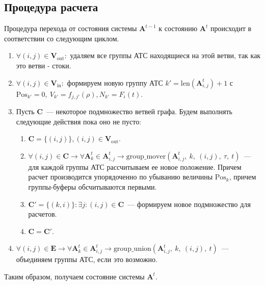 \subsection{Процедура расчета}
Процедура перехода от состояния системы $\mathbf{A}^{t-1}$ к состоянию $\mathbf{A}^t$ происходит в соответствии со следующим циклом.
\begin{enumerate}
  \item $\forall (i, j) \in \mathbf{V}_\text{out}:$ удаляем все группы АТС находящиеся на этой ветви, так как это ветви - стоки.
  \item $\forall (i, j) \in \mathbf{V}_\text{in}:$ формируем новую группу АТС $k' = \text{len}(\mathbf{A}^t_{i,j}) + 1$ с $\mathrm{Pos}_{k'}  = 0,\ V_{k'}  = f_{j,j'}(\rho), N_{k'} = F_i(t)$.
  \item Пусть $\mathbf{C}$~--- некоторое подмножество ветвей графа. Будем выполнять следующие действия пока оно не пусто:
  \begin{enumerate}
      \item $\mathbf{C} = \{(i, j)\}, (i, j) \in \mathbf{V}_\text{out}$.
      \item $\forall (i, j) \in \mathbf{C} \rightarrow \forall \mathbf{A}^t_k \in \mathbf{A}^t_{i,j} \rightarrow \text{group\_mover}(\mathbf{A}^t_{i,j},\ k,\ (i,j),\ \tau,\ t)$~--- для каждой группы АТС рассчитываем ее новое положение. Причем расчет производится упорядоченно по убыванию величины $\mathrm{Pos}_{k}$, причем группы-буферы обсчитываются первыми.
      \item $\mathbf{C'} = \{(k, i)\}: \exists j: (i, j) \in \mathbf{C}$~--- формируем новое подмножество для расчетов.
      \item $\mathbf{C} = \mathbf{C'}$.
  \end{enumerate}
  \item $\forall (i, j) \in \mathbf{E} \rightarrow \forall \mathbf{A}^t_k \in \mathbf{A}^t_{i,j} \rightarrow \text{group\_union}(\mathbf{A}^t_{i,j},\ k,\ (i,j),\ t)$~--- объединяем группы АТС, если это возможно.
\end{enumerate}

Таким образом, получаем состояние системы $\mathbf{A}^t$.

\FloatBarrier
